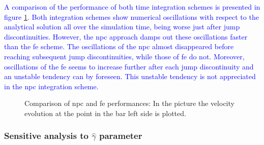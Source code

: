 \documentclass[preprint,12pt,a4paper]{elsarticle}
\begin{document}
\textcolor{blue}{A comparison of the performance of both time integration schemes is presented in figure \ref{fig:Dyka-NPC-FE}. Both integration schemes show numerical oscillations with respect to the analytical solution all over the simulation time, being worse just after jump discontinuities. However, the \acrshort{npc} approach damps out these oscillations faster than the \acrshort{fe} scheme. The oscillations of the \acrshort{npc} almost disappeared before reaching subsequent jump discontinuities, while those of \acrshort{fe} do not. Moreover, oscillations of the \acrshort{fe} seems to increase further after each jump discontinuity and an unstable tendency can by foreseen. This unstable tendency is not appreciated in the \acrshort{npc} integration scheme.} 
\begin{figure}
  \centering
  \caption{Comparison of \acrshort{npc} and \acrshort{fe}
      performances: In the picture the velocity evolution at the point in the bar left side
    is plotted.}
  \label{fig:Dyka-NPC-FE}
\end{figure}

\subsubsection{Sensitive analysis to $\widehat{\gamma}$ parameter}
\label{sec:Sensitive-analysis-gamma}
\end{document}

